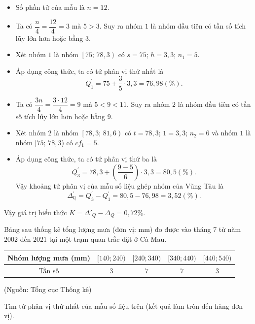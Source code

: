 \begin{bt}
{\begin{itemize}
\begin{itemize}
				\item Số phần tử của mẫu là $n=12$.
				\item Ta có $\dfrac{n}{4}=\dfrac{12}{4}=3$ mà $5> 3$. Suy ra nhóm $1$ là nhóm đầu tiên có tần số tích lũy lớn hơn hoặc bằng $3$.
				\item Xét nhóm $1$ là nhóm $\left[75;\,78{,}3\right)$ có $s=75$; $h=3{,}3$; $n_1=5$.
				\item Áp dụng công thức, ta có tứ phân vị thứ nhất là
				\[Q_1^{'}=75+\dfrac{3}{5} \cdot 3{,}3=76{,}98\left(\% \right).
				\]
				\item Ta có $\dfrac{3n}{4}=\dfrac{3\cdot 12}{4}=9$ mà $5< 9< 11$. Suy ra nhóm $2$ là nhóm đầu tiên có tần số tích lũy lớn hơn hoặc bằng $9$.
				\item Xét nhóm $2$ là nhóm $\left[78{,}3;\,81{,}6\right)$ có $t=78{,}3$; $1=3{,}3$; $n_2=6$ và nhóm $1$ là nhóm $[75;\,78{,}3$) có $cf_1=5$.
				\item Áp dụng công thức, ta có tứ phân vị thứ ba là
				\[Q_3^{'}=78{,}3+\left(\dfrac{9-5}{6} \right)\cdot 3,3=80{,}5\left(\% \right).
				\]
				Vậy khoảng tứ phân vị của mẫu số liệu ghép nhóm của Vũng Tàu là
				\[\Delta _{\mathbb{Q}}^{'}=Q_3^{'}-Q_1^{'}=80{,}5-76{,}98=3{,}52\left(\% \right).
				\]
			\end{itemize}	
			Vậy giá trị biểu thức $K=\Delta '_Q-\Delta_Q=0{,}72\%$.
		\end{itemize}
	}
\end{bt}

\begin{bt}%

	Bảng sau thống kê tổng lượng mưa (đơn vị: mm) đo được vào tháng $7$ từ năm $2002$ đến $2021$ tại một trạm quan trắc đặt ở Cà Mau.
	\begin{center}
		\begin{tabular}{|c|c|c|c|c|}
			\hline
			Nhóm lượng mưa (mm) & $[140;240)$ & $[240;340)$ & $[340;440)$ & $[440;540)$ \\
			\hline
			Tần số & $3$ & $7$ & $7$ & $3$ \\
			\hline
		\end{tabular}
	\end{center}
	\begin{flushright}
		(Nguồn: Tổng cục Thống kê)
	\end{flushright}
	Tìm tứ phân vị thứ nhất của mẫu số liệu trên (kết quả làm tròn đến hàng đơn vị).
\end{bt}

